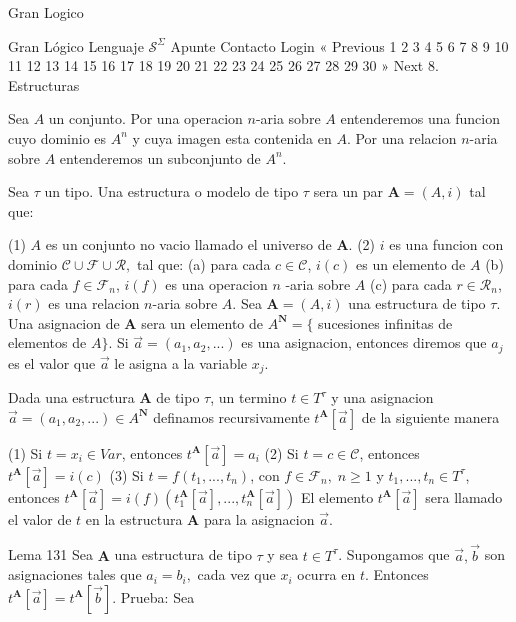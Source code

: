 Gran Logico

Gran Lógico
Lenguaje \(\mathcal{S}^{\Sigma }\)
Apunte
Contacto
Login
« Previous
1
2
3
4
5
6
7
8
9
10
11
12
13
14
15
16
17
18
19
20
21
22
23
24
25
26
27
28
29
30
» Next
8. Estructuras

Sea \(A\) un conjunto. Por una operacion \(n\)-aria sobre \(A\) entenderemos una funcion cuyo dominio es \(A^{n}\) y cuya imagen esta contenida en \(A.\) Por una relacion \(n\)-aria sobre \(A\) entenderemos un subconjunto de \(A^{n}\).

Sea \(\tau \) un tipo. Una estructura o modelo de tipo \(\tau \) sera un par \(\mathbf{A}=(A,i)\) tal que:

(1) \(A\) es un conjunto no vacio llamado el universo de \( \mathbf{A}.\)
(2) \(i\) es una funcion con dominio \(\mathcal{C}\cup \mathcal{F}\cup \mathcal{R},\) tal que:
(a) para cada \(c\in \mathcal{C}\), \(i(c)\) es un elemento de \(A\)
(b) para cada \(f\in \mathcal{F}_{n}\), \(i(f)\) es una operacion \(n\) -aria sobre \(A\)
(c) para cada \(r\in \mathcal{R}_{n}\), \(i(r)\) es una relacion \(n\)-aria sobre \(A.\)
Sea \(\mathbf{A}=(A,i)\) una estructura de tipo \(\tau \). Una asignacion de \(\mathbf{A}\) sera un elemento de \(A^{\mathbf{N}}=\{\) sucesiones infinitas de elementos de \(A\}\). Si \(\vec{a}=(a_{1},a_{2},...)\) es una asignacion, entonces diremos que \(a_{j}\) es el valor que \( \vec{a}\) le asigna a la variable \(x_{j}\).

Dada una estructura \(\mathbf{A}\) de tipo \(\tau \), un termino \(t\in T^{\tau }\) y una asignacion \(\vec{a}=(a_{1},a_{2},...)\in A^{\mathbf{N}}\) definamos recursivamente \(t^{\mathbf{A}}[\vec{a}]\) de la siguiente manera

(1) Si \(t=x_{i}\in Var\), entonces \(t^{\mathbf{A}}[\vec{a}]=a_{i}\)
(2) Si \(t=c\in \mathcal{C}\), entonces \(t^{\mathbf{A}}[\vec{a}]=i(c)\)
(3) Si \(t=f(t_{1},...,t_{n})\), con \(f\in \mathcal{F}_{n},\;n\geq 1\) y \(t_{1},...,t_{n}\in T^{\tau }\), entonces \(t^{\mathbf{A}}[\vec{a} ]=i(f)(t_{1}^{\mathbf{A}}[\vec{a}],...,t_{n}^{\mathbf{A}}[\vec{a}])\)
El elemento \(t^{\mathbf{A}}[\vec{a}]\) sera llamado el valor de \(t\) en la estructura \(\mathbf{A}\) para la asignacion \(\vec{a}\).

Lema 131 Sea \(\mathbf{A}\) una estructura de tipo \(\tau \) y sea \(t\in T^{\tau }\). Supongamos que \(\vec{a},\vec{b}\) son asignaciones tales que \(a_{i}=b_{i},\) cada vez que \(x_{i}\) ocurra en \(t\). Entonces \(t^{ \mathbf{A}}[\vec{a}]=t^{\mathbf{A}}[\vec{b}]\).
Prueba: Sea


